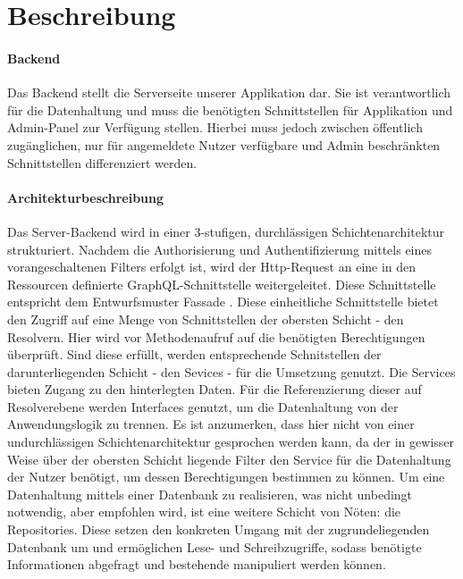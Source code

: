 \section*{Beschreibung}%

\paragraph*{Backend}
Das \dq Backend \dq stellt die Serverseite unserer Applikation dar. Sie ist verantwortlich für die Datenhaltung und muss die benötigten Schnittstellen für Applikation und Admin-Panel zur Verfügung stellen.
 Hierbei muss jedoch zwischen öffentlich zugänglichen, nur für angemeldete Nutzer verfügbare und Admin beschränkten Schnittstellen differenziert werden.
\paragraph*{Architekturbeschreibung}
Das Server-Backend wird in einer 3-stufigen, durchlässigen Schichtenarchitektur strukturiert. Nachdem die Authorisierung und Authentifizierung
mittels eines vorangeschaltenen Filters erfolgt ist, wird der Http-Request an eine in den Ressourcen definierte GraphQL-Schnittstelle weitergeleitet. Diese Schnittstelle
entspricht dem Entwurfsmuster \dq Fassade \dq. Diese einheitliche Schnittstelle bietet den Zugriff auf eine Menge von Schnittstellen der obersten Schicht - den Resolvern.
Hier wird vor Methodenaufruf auf die benötigten Berechtigungen überprüft. Sind diese erfüllt, werden entsprechende Schnitstellen der darunterliegenden Schicht - den Sevices - 
für die Umsetzung genutzt. Die Services bieten Zugang zu den hinterlegten Daten. Für die Referenzierung dieser auf Resolverebene werden Interfaces genutzt, um die Datenhaltung 
von der Anwendungslogik zu trennen. Es ist anzumerken, dass hier nicht von einer undurchlässigen Schichtenarchitektur gesprochen werden kann, da der in gewisser Weise
über der obersten Schicht liegende Filter den Service für die Datenhaltung der Nutzer benötigt, um dessen Berechtigungen bestimmen zu können.
Um eine Datenhaltung mittels einer Datenbank zu realisieren, was nicht unbedingt notwendig, aber empfohlen wird, ist eine weitere Schicht von Nöten: die Repositories.
Diese setzen den konkreten Umgang mit der zugrundeliegenden Datenbank um und ermöglichen Lese- und Schreibzugriffe, sodass benötigte Informationen abgefragt und bestehende manipuliert 
werden können.
 
